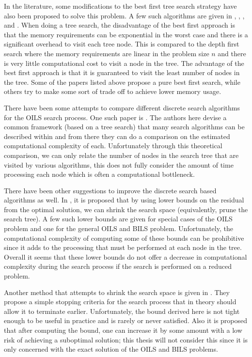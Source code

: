 \documentclass[12pt,Bold,letterpaper]{mcgilletdclass}
\begin{document}
In the literature, some modifications to the best first tree search strategy have also been proposed to solve this problem. A few such algorithms are given in \cite{MurGDC06}, \cite{XuWZW04}, \cite{FukMU04}, \cite{StuBF07} and \cite{DaiY08}. When doing a tree search, the disadvantage of the best first approach is that the memory requirements can be exponential in the worst case and there is a significant overhead to visit each tree node. This is compared to the depth first search where the memory requirements are linear in the problem size $n$ and there is very little computational cost to visit a node in the tree. The advantage of the best first approach is that it is guaranteed to visit the least number of nodes in the tree. Some of the papers listed above propose a pure best first search, while others try to make some sort of trade off to achieve lower memory usage.

There have been some attempts to compare different discrete search algorithms for the OILS search process. One such paper is \cite{MurGDC06}. The authors here devise a common framework (based on a tree search) that many search algorithms can be described within and from there they can do a comparison on the estimated computational complexity of each. Unfortunately through this theoretical comparison, we can only relate the number of nodes in the search tree that are visited by various algorithms, this does not fully consider the amount of time processing each node which is often a computational bottleneck.

There have been other suggestions to improve the discrete search based algorithms as well. In \cite{StoVH08}, it is proposed that by using lower bounds on the residual from the optimal solution, we can shrink the search space (equivalently, prune the search tree). A few such lower bounds are given for special cases of the OILS problem and one for the general OILS and BILS problem. Unfortunately, the computational complexity of computing some of these bounds can be prohibitive since it adds to the processing that must be performed at each node in the tree. Overall it seems that these lower bounds do not offer a decrease in computational complexity during the search process if the search is performed on a reduced problem.

Another method that attempts to shrink the search space is given in \cite{SchFL09}. They propose a simple stopping criteria for the search process that in theory should allow it to terminate earlier. Unfortunately, the bound derived here is not tight enough to be useful in practice and is rarely or never satisfied. Also it is proposed that after computing the bound, one can increase it by some amount with a low risk of achieving a suboptimal solution; this thesis will not consider this since it is only concerned with the exact solution of the OILS and BILS problems. 
\end{document}
